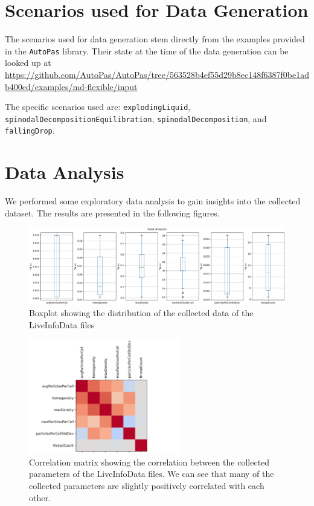 \section{Scenarios used for Data Generation}
\label{des:scenarios}

The scenarios used for data generation stem directly from the examples provided in the \texttt{AutoPas} library. Their state at the time of the data generation can be looked up at \small{
  \url{
    https://github.com/AutoPas/AutoPas/tree/563528b4ef55d29b8ec148f6387f0be1adb400ed/examples/md-flexible/input
  }
}

The specific scenarios used are: \texttt{explodingLiquid}, \texttt{spinodalDecompositionEquilibration}, \texttt{spinodalDecomposition}, and \texttt{fallingDrop}.


\section{Data Analysis}

We performed some exploratory data analysis to gain insights into the collected dataset. The results are presented in the following figures.

\begin{figure}[H]
  \centering
  \includegraphics[width=\columnwidth,trim={0 0 0 0.5cm},clip]{figures/DataAnalytics/input_analysis.png}
  \caption[Boxplot of the collected Dataset]{Boxplot showing the distribution of the collected data of the LiveInfoData files}
  \label{fig:inputAnalysisBoxplot}
\end{figure}

\begin{figure}[H]
  \centering
  \includegraphics[height=5cm,trim={0cm 0 2cm 0cm},clip]{figures/DataAnalytics/correlation_matrix.png}
  \caption[Correlation Matrix of the collected Dataset]{Correlation matrix showing the correlation between the collected parameters of the LiveInfoData files. We can see that many of the collected parameters are slightly positively correlated with each other.}
  \label{fig:corrMatrix}
\end{figure}

